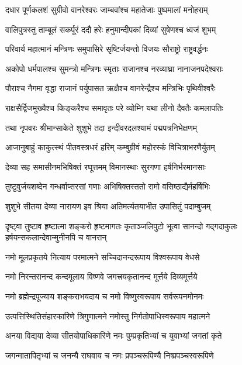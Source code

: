 \twolineshloka
{दधार पूर्णकलशं सुग्रीवो वानरेश्वरः}
{जाम्बवांश्च महातेजाः पुष्पमालां मनोहराम्}%

\twolineshloka
{वालिपुत्रस्तु ताम्बूलं सकर्पूरं ददौ हरेः}
{हनुमान्दीपकां दिव्यां सुषेणश्च ध्वजं शुभम्}%

\twolineshloka
{परिवार्य महात्मानं मन्त्रिणः समुपासिरे}
{सृष्टिर्जयन्तो विजयः सौराष्ट्रो राष्ट्रवर्द्धनः}%

\twolineshloka
{अकोपो धर्मपालश्च सुमन्त्रो मन्त्रिणः स्मृताः}
{राजानश्च नरव्याघ्रा नानाजनपदेश्वराः}%

\twolineshloka
{पौराश्च नैगमा वृद्धा राजानं पर्युपासत}
{ऋक्षैश्च वानरेन्द्रैश्च मन्त्रिभिः पृथिवीश्वरैः}%

\twolineshloka
{राक्षसैर्द्विजमुख्यैश्च किङ्करैश्च समावृतः}
{परे व्योम्नि यथा लीनो दैवतैः कमलापतिः}%

\twolineshloka
{तथा नृपवरः श्रीमान्साकेते शुशुभे तदा}
{इन्दीवरदलश्यामं पद्मपत्रनिभेक्षणम्}%

\twolineshloka
{आजानुबाहुं काकुत्स्थं पीतवस्त्रधरं हरिम्}
{कम्बुग्रीवं महोरस्कं विचित्राभरणैर्युतम्}%

\twolineshloka
{देव्या सह समासीनमभिषिक्तं रघूत्तमम्}
{विमानस्थाः सुरगणा हर्षनिर्भरमानसाः}%

\twolineshloka
{तुष्टुवुर्जयशब्देन गन्धर्वाप्सरसां गणाः}
{अभिषिक्तस्ततो रामो वसिष्ठाद्यैर्महर्षिभिः}%

\twolineshloka
{शुशुभे सीतया देव्या नारायण इव श्रिया}
{अतिमर्त्यतयाभीत उपासितुं पदाम्बुजम्}%

\threelineshloka
{दृष्ट्वा तुष्टाव हृष्टात्मा शङ्करो हृष्टमागतः}
{कृताञ्जलिपुटो भूत्वा सानन्दो गद्गदाकुलः}
{हर्षयन्सकलान्देवान्मुनीनपि च वानरान्}%


\twolineshloka
{नमो मूलप्रकृतये नित्याय परमात्मने}
{सच्चिदानन्दरूपाय विश्वरूपाय वेधसे}%

\twolineshloka
{नमो निरन्तरानन्द कन्दमूलाय विष्णवे}
{जगत्त्रयकृतानन्द मूर्त्तये दिव्यमूर्त्तये}%

\twolineshloka
{नमो ब्रह्मेन्द्रपूज्याय शङ्कराभयदाय च}
{नमो विष्णुस्वरूपाय सर्वरूपनमोनमः}%

\twolineshloka
{उत्पत्तिस्थितिसंहारकारिणे त्रिगुणात्मने}
{नमोस्तु निर्गतोपाधिस्वरूपाय महात्मने}%

\twolineshloka
{अनया विद्यया देव्या सीतयोपाधिकारिणे}
{नमः पुम्प्रकृतिभ्यां च युवाभ्यां जगतां कृते}%

\twolineshloka
{जगन्मातापितृभ्यां च जनन्यै राघवाय च}
{नमः प्रपञ्चरूपिण्यै निष्प्रपञ्चस्वरूपिणे}%

